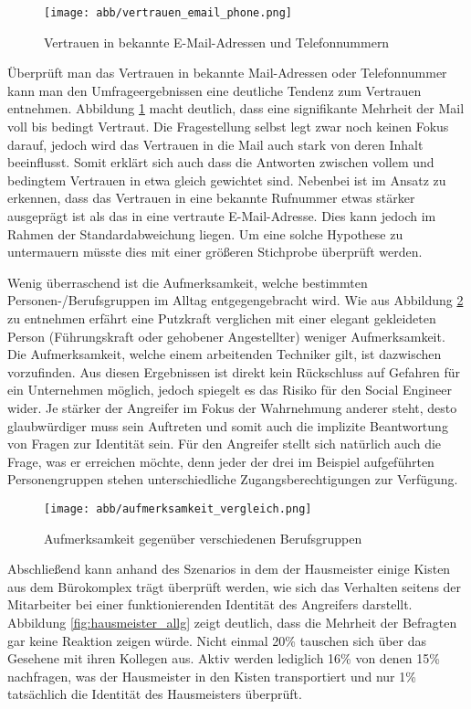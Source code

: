 \begin{figure}[htbp]
	\centering
	\texttt{[image: abb/vertrauen\_email\_phone.png]}
	\caption{Vertrauen in bekannte E-Mail-Adressen und Telefonnummern}
	\label{fig:vertrauen-mail-phone}
\end{figure}

Überprüft man das Vertrauen in bekannte Mail-Adressen oder Telefonnummer kann man den Umfrageergebnissen eine deutliche Tendenz zum Vertrauen entnehmen.
Abbildung \ref{fig:vertrauen-mail-phone} macht deutlich, dass eine signifikante Mehrheit der Mail voll bis bedingt Vertraut.
Die Fragestellung selbst legt zwar noch keinen Fokus darauf, jedoch wird das Vertrauen in die Mail auch stark von deren Inhalt beeinflusst.
Somit erklärt sich auch dass die Antworten zwischen vollem und bedingtem Vertrauen in etwa gleich gewichtet sind.
Nebenbei ist im Ansatz zu erkennen, dass das Vertrauen in eine bekannte Rufnummer etwas stärker ausgeprägt ist als das in eine vertraute E-Mail-Adresse.
Dies kann jedoch im Rahmen der Standardabweichung liegen.
Um eine solche Hypothese zu untermauern müsste dies mit einer größeren Stichprobe überprüft werden.

Wenig überraschend ist die Aufmerksamkeit, welche bestimmten Personen-/Berufsgruppen im Alltag entgegengebracht wird.
Wie aus Abbildung \ref{fig:aufmerksamkeit} zu entnehmen erfährt eine Putzkraft verglichen mit einer elegant gekleideten Person (Führungskraft oder gehobener Angestellter) weniger Aufmerksamkeit.
Die Aufmerksamkeit, welche einem arbeitenden Techniker gilt, ist dazwischen vorzufinden.
Aus diesen Ergebnissen ist direkt kein Rückschluss auf Gefahren für ein Unternehmen möglich, jedoch spiegelt es das Risiko für den Social Engineer wider.
Je stärker der Angreifer im Fokus der Wahrnehmung anderer steht, desto glaubwürdiger muss sein Auftreten und somit auch die implizite Beantwortung von Fragen zur Identität sein.
Für den Angreifer stellt sich natürlich auch die Frage, was er erreichen möchte, denn jeder der drei im Beispiel aufgeführten Personengruppen stehen unterschiedliche Zugangsberechtigungen zur Verfügung.

\begin{figure}[htbp]
	\centering
	\texttt{[image: abb/aufmerksamkeit\_vergleich.png]}
	\caption{Aufmerksamkeit gegenüber verschiedenen Berufsgruppen}
	\label{fig:aufmerksamkeit}
\end{figure}

Abschließend kann anhand des Szenarios in dem der Hausmeister einige Kisten aus dem Bürokomplex trägt überprüft werden, wie sich das Verhalten seitens der Mitarbeiter bei einer funktionierenden Identität des Angreifers darstellt.
Abbildung \ref{fig:hausmeister_allg} zeigt deutlich, dass die Mehrheit der Befragten gar keine Reaktion zeigen würde.
Nicht einmal 20\% tauschen sich über das Gesehene mit ihren Kollegen aus.
Aktiv werden lediglich 16\% von denen 15\% nachfragen, was der Hausmeister in den Kisten transportiert und nur 1\% tatsächlich die Identität des Hausmeisters überprüft.

